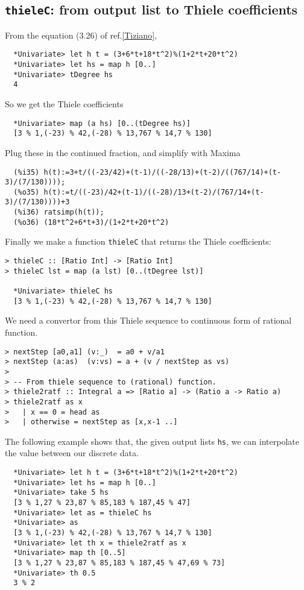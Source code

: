 \documentclass[11pt]{book}
\begin{document}
\subsection{\texttt{thieleC}: from output list to Thiele coefficients}
From the equation (3.26) of ref.\ref{Tiziano},
\begin{verbatim}
  *Univariate> let h t = (3+6*t+18*t^2)%(1+2*t+20*t^2)
  *Univariate> let hs = map h [0..]
  *Univariate> tDegree hs
  4
\end{verbatim}
So we get the Thiele coefficients
\begin{verbatim}  
  *Univariate> map (a hs) [0..(tDegree hs)]
  [3 % 1,(-23) % 42,(-28) % 13,767 % 14,7 % 130]
\end{verbatim}
Plug these in the continued fraction, and simplify with Maxima
\begin{verbatim}
  (%i35) h(t):=3+t/((-23/42)+(t-1)/((-28/13)+(t-2)/((767/14)+(t-3)/(7/130))));
  (%o35) h(t):=t/((-23)/42+(t-1)/((-28)/13+(t-2)/(767/14+(t-3)/(7/130))))+3
  (%i36) ratsimp(h(t));
  (%o36) (18*t^2+6*t+3)/(1+2*t+20*t^2)
\end{verbatim}

Finally we make a function \verb+thieleC+ that returns the Thiele coefficients:
\begin{verbatim}
> thieleC :: [Ratio Int] -> [Ratio Int]
> thieleC lst = map (a lst) [0..(tDegree lst)]

  *Univariate> thieleC hs
  [3 % 1,(-23) % 42,(-28) % 13,767 % 14,7 % 130]
\end{verbatim}

We need a convertor from this Thiele sequence to continuous form of rational function.
\begin{verbatim}
> nextStep [a0,a1] (v:_)  = a0 + v/a1
> nextStep (a:as)  (v:vs) = a + (v / nextStep as vs)
>
> -- From thiele sequence to (rational) function.
> thiele2ratf :: Integral a => [Ratio a] -> (Ratio a -> Ratio a)
> thiele2ratf as x
>   | x == 0 = head as
>   | otherwise = nextStep as [x,x-1 ..]
\end{verbatim}
The following example shows that, the given output lists \verb+hs+, we can interpolate the value between our discrete data.
\begin{verbatim}
  *Univariate> let h t = (3+6*t+18*t^2)%(1+2*t+20*t^2)
  *Univariate> let hs = map h [0..]
  *Univariate> take 5 hs
  [3 % 1,27 % 23,87 % 85,183 % 187,45 % 47]
  *Univariate> let as = thieleC hs
  *Univariate> as
  [3 % 1,(-23) % 42,(-28) % 13,767 % 14,7 % 130]
  *Univariate> let th x = thiele2ratf as x
  *Univariate> map th [0..5]
  [3 % 1,27 % 23,87 % 85,183 % 187,45 % 47,69 % 73]
  *Univariate> th 0.5
  3 % 2
\end{verbatim}
\end{document}
